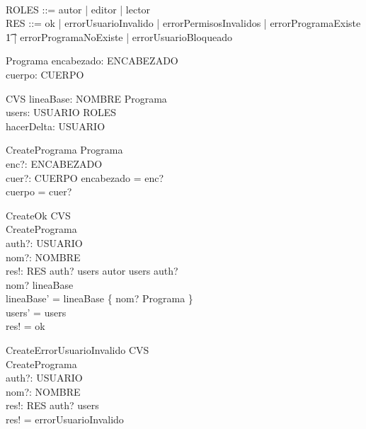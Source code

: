 \documentclass[a4paper, 12pt] {article}
\begin{document}
\begin{zed}
 \\
ROLES ::= autor | editor | lector \\
RES ::= ok | errorUsuarioInvalido | errorPermisosInvalidos | errorProgramaExiste \\
\t1 | errorProgramaNoExiste | errorUsuarioBloqueado
\end{zed}

\begin{schema}{Programa}
encabezado: ENCABEZADO \\
cuerpo: CUERPO
\end{schema}

\begin{schema}{CVS}
lineaBase: NOMBRE \pfun \seq Programa \\
users: USUARIO \pfun \power ROLES \\
hacerDelta: \power USUARIO
\end{schema}

\begin{schema}{CreatePrograma}
Programa \\
enc?: ENCABEZADO \\
cuer?: CUERPO
\where
encabezado = enc? \\
cuerpo = cuer?
\end{schema}

\begin{schema}{CreateOk}
\Delta CVS \\
CreatePrograma \\
auth?: USUARIO \\
nom?: NOMBRE \\
res!: RES
\where
auth? \in \dom users \land autor \in users \: auth? \\
nom? \notin \dom lineaBase \\
lineaBase' = lineaBase \cup \{ nom? \mapsto \langle \theta Programa \rangle \} \\
users' = users \\
res! = ok
\end{schema}

\begin{schema}{CreateErrorUsuarioInvalido}
\Xi CVS \\
CreatePrograma \\
auth?: USUARIO \\
nom?: NOMBRE \\
res!: RES
\where
auth? \notin \dom users \\
res! = errorUsuarioInvalido
\end{schema}
\end{document}
